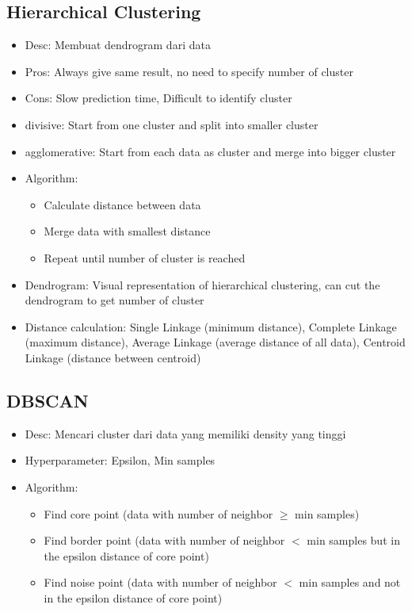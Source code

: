 \documentclass[conference]{IEEEtran}
\begin{document}
\subsection{Hierarchical Clustering}

\begin{itemize}
    \item Desc: Membuat dendrogram dari data
    \item Pros: Always give same result, no need to specify number of cluster
    \item Cons: Slow prediction time, Difficult to identify cluster
    \item divisive: Start from one cluster and split into smaller cluster
    \item agglomerative: Start from each data as cluster and merge into bigger cluster
    \item Algorithm: 
    \begin{itemize}
        \item Calculate distance between data
        \item Merge data with smallest distance
        \item Repeat until number of cluster is reached
    \end{itemize}
    \item Dendrogram: Visual representation of hierarchical clustering, can cut the dendrogram to get number of cluster
    \item Distance calculation: Single Linkage (minimum distance), Complete Linkage (maximum distance), Average Linkage (average distance of all data), Centroid Linkage (distance between centroid)
\end{itemize}

\subsection{DBSCAN}

\begin{itemize}
    \item Desc: Mencari cluster dari data yang memiliki density yang tinggi
    \item Hyperparameter: Epsilon, Min samples
    \item Algorithm: 
    \begin{itemize}
        \item Find core point (data with number of neighbor \(\ge\) min samples)
        \item Find border point (data with number of neighbor \(<\) min samples but in the epsilon distance of core point)
        \item Find noise point (data with number of neighbor \(<\) min samples and not in the epsilon distance of core point)
    \end{itemize}
\end{itemize}
\end{document}
